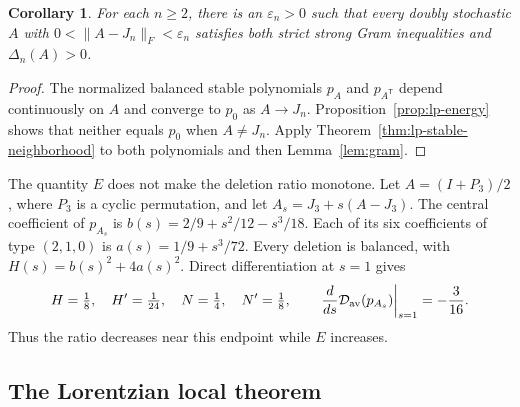 \documentclass[11pt,a4paper]{article}
\newtheorem{corollary}[theorem]{Corollary}
\theoremstyle{definition}
\theoremstyle{remark}
\newcommand{\T}{\mathsf{T}}
\begin{document}
\begin{corollary}\label{cor:lp-matrix-local}
For each $n\ge2$, there is an $\varepsilon_n>0$ such that every doubly stochastic $A$ with
$0<\|A-J_n\|_F<\varepsilon_n$ satisfies both strict strong Gram inequalities and $\Delta_n(A)>0$.
\end{corollary}
\begin{proof}
The normalized balanced stable polynomials $p_A$ and $p_{A^\T}$ depend continuously on $A$ and converge to $p_0$ as $A\to J_n$.
Proposition~\ref{prop:lp-energy} shows that neither equals $p_0$ when $A\ne J_n$.
Apply Theorem~\ref{thm:lp-stable-neighborhood} to both polynomials and then Lemma~\ref{lem:gram}.
\end{proof}

The quantity $E$ does not make the deletion ratio monotone.
Let $A=(I+P_3)/2$, where $P_3$ is a cyclic permutation, and let $A_s=J_3+s(A-J_3)$.
The central coefficient of $p_{A_s}$ is
$b(s)=2/9+s^2/12-s^3/18$.
Each of its six coefficients of type $(2,1,0)$ is $a(s)=1/9+s^3/72$.
Every deletion is balanced, with $H(s)=b(s)^2+4a(s)^2$.
Direct differentiation at $s=1$ gives
\[
 H=\tfrac18,\quad H'=\tfrac1{24},\quad N=\tfrac14,\quad N'=\tfrac18,
 \qquad \left.\frac{d}{ds}\mathcal D_{\rm av}(p_{A_s})\right|_{s=1}=-\frac3{16}.
\]
Thus the ratio decreases near this endpoint while $E$ increases.

\subsection{The Lorentzian local theorem}
\end{document}
